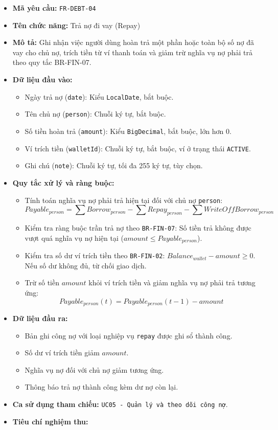 \documentclass[11pt,a4paper]{article}
\providecommand{\tightlist}{
  \setlength{\itemsep}{0pt}\setlength{\parskip}{0pt}}
\begin{document}
\begin{itemize}
\tightlist
\item
  \textbf{Mã yêu cầu:} \texttt{FR-DEBT-04}
\item
  \textbf{Tên chức năng:} Trả nợ đi vay (Repay)
\item
  \textbf{Mô tả:} Ghi nhận việc người dùng hoàn trả một phần hoặc toàn
  bộ số nợ đã vay cho chủ nợ, trích tiền từ ví thanh toán và giảm trừ
  nghĩa vụ nợ phải trả theo quy tắc BR-FIN-07.
\item
  \textbf{Dữ liệu đầu vào:}

  \begin{itemize}
  \tightlist
  \item
    Ngày trả nợ (\texttt{date}): Kiểu \texttt{LocalDate}, bắt buộc.
  \item
    Tên chủ nợ (\texttt{person}): Chuỗi ký tự, bắt buộc.
  \item
    Số tiền hoàn trả (\texttt{amount}): Kiểu \texttt{BigDecimal}, bắt
    buộc, lớn hơn 0.
  \item
    Ví trích tiền (\texttt{walletId}): Chuỗi ký tự, bắt buộc, ví ở trạng
    thái \texttt{ACTIVE}.
  \item
    Ghi chú (\texttt{note}): Chuỗi ký tự, tối đa 255 ký tự, tùy chọn.
  \end{itemize}
\item
  \textbf{Quy tắc xử lý và ràng buộc:}

  \begin{itemize}
  \tightlist
  \item
    Tính toán nghĩa vụ nợ phải trả hiện tại đối với chủ nợ
    \texttt{person}:
    \[Payable_{person} = \sum Borrow_{person} - \sum Repay_{person} - \sum WriteOffBorrow_{person}\]
  \item
    Kiểm tra ràng buộc trần trả nợ theo \texttt{BR-FIN-07}: Số tiền trả
    không được vượt quá nghĩa vụ nợ hiện tại
    (\(amount \le Payable_{person}\)).
  \item
    Kiểm tra số dư ví trích tiền theo \texttt{BR-FIN-02}:
    \(Balance_{wallet} - amount \ge 0\). Nếu số dư không đủ, từ chối
    giao dịch.
  \item
    Trừ số tiền \(amount\) khỏi ví trích tiền và giảm nghĩa vụ nợ phải
    trả tương ứng:
    \[Payable_{person}(t) = Payable_{person}(t-1) - amount\]
  \end{itemize}
\item
  \textbf{Dữ liệu đầu ra:}

  \begin{itemize}
  \tightlist
  \item
    Bản ghi công nợ với loại nghiệp vụ \texttt{repay} được ghi sổ thành
    công.
  \item
    Số dư ví trích tiền giảm \(amount\).
  \item
    Nghĩa vụ nợ đối với chủ nợ giảm tương ứng.
  \item
    Thông báo trả nợ thành công kèm dư nợ còn lại.
  \end{itemize}
\item
  \textbf{Ca sử dụng tham chiếu:}
  \texttt{UC05\ -\ Quản\ lý\ và\ theo\ dõi\ công\ nợ}.
\item
  \textbf{Tiêu chí nghiệm thu:}


\end{itemize}
\end{document}
